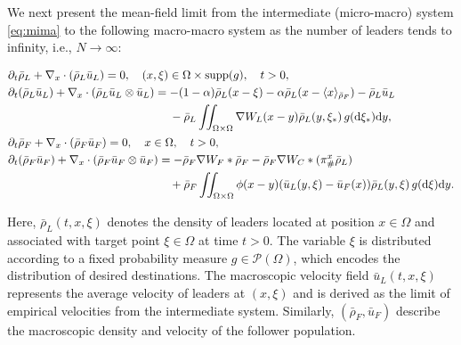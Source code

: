 \documentclass[10pt, reqno]{amsart}
\theoremstyle{definition}
\theoremstyle{remark}
\numberwithin{equation}{section}
\newcommand{\dy}{\textnormal{d}y}
\newcommand{\dxi}{\textnormal{d}\xi}
\newcommand{\p}{\partial}
\begin{document}
We next present the mean-field limit from the intermediate (micro-macro) system \eqref{eq:mima} to the following macro-macro system as the number of leaders tends to infinity, i.e., $N \to \infty$:
\begin{mybox}
\begin{align}\label{eq:mama}
\begin{aligned}
    &\p_t \bar \rho_L + \nabla_x\cdot (\bar \rho_L \bar u_L) = 0, \quad (x,\xi)\in \Omega\times\textnormal{supp}(g), \quad t>0,\\
    &\p_t (\bar \rho_L \bar u_L) + \nabla_x \cdot (\bar \rho_L \bar u_L \otimes \bar u_L) = -(1-\alpha) \bar \rho_L (x-\xi) - \alpha \bar \rho_L (x - \langle x \rangle_{\bar \rho_F}) - \bar \rho_L \bar u_L\\
    &\qquad\qquad\qquad\qquad\qquad\qquad\qquad - \bar\rho_L \iint_{\Omega \times \Omega} \nabla W_L(x-y)\bar\rho_L(y,\xi_*)\, g(\dxi_*) \dy,\\
    & \p_t \bar\rho_F + \nabla_x \cdot (\bar\rho_F \bar u_F) = 0,  \quad x\in \Omega, \quad t > 0,\\
    &\p_t (\bar\rho_F \bar u_F) + \nabla_x \cdot (\bar\rho_F \bar u_F \otimes \bar u_F ) = - \bar\rho_F \nabla W_F * \bar \rho_F - \bar\rho_F \nabla W_C * (\pi^x_{\#}\bar\rho_L) \\
    &\qquad \qquad \qquad \qquad \qquad \qquad \qquad + \bar\rho_F \iint_{\Omega\times\Omega} \phi(x-y) (\bar u_L (y,\xi) - \bar u_F(x) ) \bar \rho_L(y,\xi) \,   g(\dxi) \dy .
\end{aligned}
\end{align} 
\end{mybox}
Here, $\bar \rho_L(t,x,\xi)$ denotes the density of leaders located at position $x \in \Omega$ and associated with target point $\xi \in \Omega$ at time $t > 0$. The variable $\xi$ is distributed according to a fixed probability measure $g \in \mathcal{P}(\Omega)$, which encodes the distribution of desired destinations. The macroscopic velocity field $\bar u_L(t,x,\xi)$ represents the average velocity of leaders at $(x,\xi)$ and is derived as the limit of empirical velocities from the intermediate system. Similarly, $(\bar \rho_F, \bar u_F)$ describe the macroscopic density and velocity of the follower population.
\end{document}
